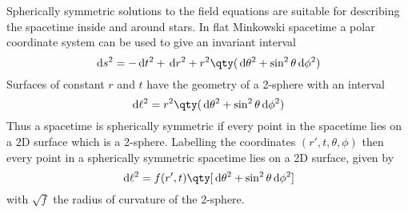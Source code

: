 Spherically symmetric solutions to the field equations are suitable
for describing the spacetime inside and around stars. In flat
Minkowski spacetime a polar coordinate system can be used to give an
invariant interval
\begin{equation}
  \label{eq:115}
  \dd{s}^2 = - \dd{t}^2 + \dd{r}^2 + r^2 \qty( \dd{\theta}^2 + \sin^2{\theta} \dd{\phi}^2 )
\end{equation}
Surfaces of constant $r$ and $t$ have the geometry of a 2-sphere with
an interval
\begin{equation}
  \label{eq:116}
  \dd{\ell}^2 = r^2 \qty( \dd{\theta}^2 + \sin^2{\theta} \dd{\phi}^2 )
\end{equation}
Thus a spacetime is spherically symmetric if every point in the
spacetime lies on a 2D surface which is a 2-sphere. Labelling the
coordinates $(r', t, \theta, \phi)$ then every point in a spherically
symmetric spacetime lies on a 2D surface, given by
\begin{equation}
  \label{eq:117}
  \dd{\ell}^2 = f(r', t) \qty[ \dd{\theta}^2 + \sin^2{\theta} \dd{\phi}^2]
\end{equation}
with $\sqrt{f}$ the radius of curvature of the 2-sphere.

